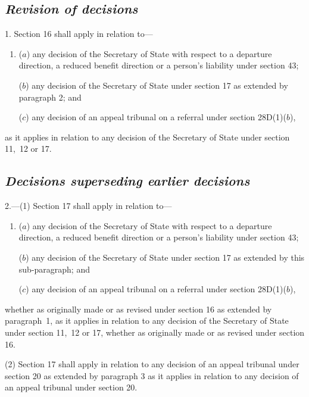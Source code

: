 \documentclass[12pt,a4paper]{article}
\begin{document}
\renewcommand\parthead{--- Schedule 4C}


\subsection*{\itshape Revision of decisions}

1. Section 16 shall apply in relation to—
\begin{enumerate}\item[]
($a$) any decision of the Secretary of State with respect to a departure direction, a reduced benefit direction or a person’s liability under section 43;

($b$) any decision of the Secretary of State under section 17 as extended by paragraph 2; and

($c$) any decision of an appeal tribunal on a referral under section 28D(1)($b$),
\end{enumerate}
as it applies in relation to any decision of the Secretary of State under section 11,~12 or 17.

\subsection*{\itshape Decisions superseding earlier decisions}

2.---(1) Section 17 shall apply in relation to—
\begin{enumerate}\item[]
($a$) any decision of the Secretary of State with respect to a departure direction, a reduced benefit direction or a person’s liability under section 43;

($b$) any decision of the Secretary of State under section 17 as extended by this sub-paragraph; and

($c$) any decision of an appeal tribunal on a referral under section 28D(1)($b$),
\end{enumerate}
whether as originally made or as revised under section 16 as extended by paragraph~1, as it applies in relation to any decision of the Secretary of State under section 11,~12 or 17, whether as originally made or as revised under section 16.

(2) Section 17 shall apply in relation to any decision of an appeal tribunal under section 20 as extended by paragraph 3 as it applies in relation to any decision of an appeal tribunal under section 20.
\end{document}
